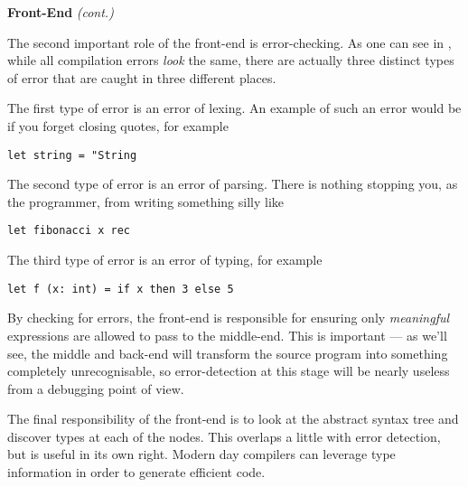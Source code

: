 \begin{minipage}[t]{0.15\textwidth}
\textbf{\sffamily Front-End} \textit{\sffamily (cont.)}    
\end{minipage}%
\begin{minipage}[t]{0.85\textwidth}
    \setlength{\parskip}{.5\baselineskip}
    The second important role of the front-end is error-checking. As one can see in , while all compilation errors \emph{look} the same, there are actually three distinct types of error that are caught in three different places. 

    The first type of error is an error of lexing. An example of such an error would be if you forget closing quotes, for example
\begin{verbatim}
let string = "String
\end{verbatim}
    The second type of error is an error of parsing. There is nothing stopping you, as the programmer, from writing something silly like 
\begin{verbatim}
let fibonacci x rec
\end{verbatim}    
    The third type of error is an error of typing, for example
\begin{verbatim}
let f (x: int) = if x then 3 else 5
\end{verbatim}
    By checking for errors, the front-end is responsible for ensuring only \emph{meaningful} expressions are allowed to pass to the middle-end. This is important --- as we'll see, the middle and back-end will transform the source program into something completely unrecognisable, so error-detection at this stage will be nearly useless from a debugging point of view.

    The final responsibility of the front-end is to look at the abstract syntax tree and discover types at each of the nodes. This overlaps a little with error detection, but is useful in its own right. Modern day compilers can leverage type information in order to generate efficient code. \strut
\end{minipage}

